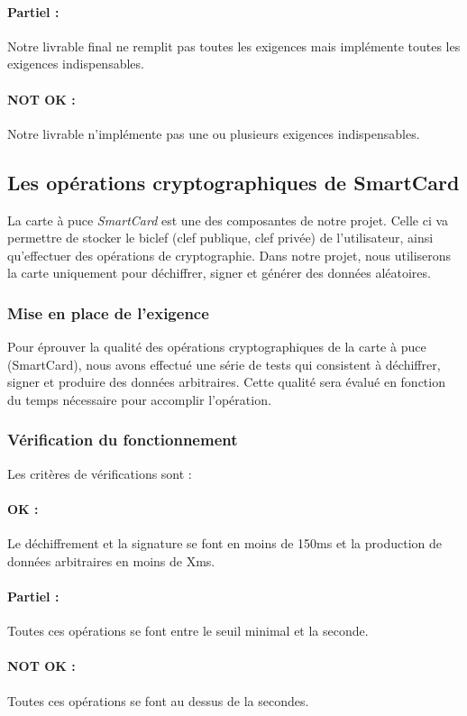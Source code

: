 \documentclass[a4paper,11pt,french]{article}
\begin{document}
\paragraph{Partiel : } Notre livrable final ne remplit pas toutes les
exigences mais implémente toutes les exigences indispensables.
\paragraph{NOT OK : } Notre livrable n'implémente pas une ou plusieurs
exigences indispensables.

\subsection{Les opérations cryptographiques de SmartCard}
	La carte à puce \emph{SmartCard} est une des composantes de notre
projet. Celle ci va permettre de stocker le biclef (clef publique, clef
privée) de l'utilisateur, ainsi qu'effectuer des opérations de cryptographie.
Dans notre projet, nous utiliserons la carte uniquement pour déchiffrer,
signer et générer des données aléatoires.
\subsubsection{Mise en place de l'exigence}
	Pour éprouver la qualité des opérations cryptographiques de la carte
à puce (SmartCard), nous avons effectué une série de tests qui consistent à
déchiffrer, signer et produire des données arbitraires. Cette qualité sera
évalué en fonction du temps nécessaire pour accomplir l'opération.

\subsubsection{Vérification du fonctionnement}
	Les critères de vérifications sont :
\paragraph{OK : } Le déchiffrement et la signature se font en moins de 150ms
 et la production de données arbitraires en moins de Xms.
\paragraph{Partiel : } Toutes ces opérations se font entre le seuil minimal
et la seconde.
\paragraph{NOT OK : } Toutes ces opérations se font au dessus de la secondes.
\end{document}
